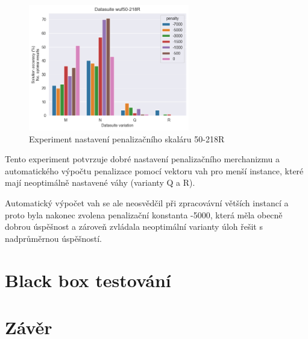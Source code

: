 \documentclass[twoside,twocolumn]{article}
\begin{document}
    \begin{figure}
        \centering
        \includegraphics[width=7cm]{images/testing/penalty/wuf50-218R}
        \caption{Experiment nastavení penalizačního skaláru 50-218R}
        \label{fig:penalty_218}
    \end{figure}

    Tento experiment potvrzuje dobré nastavení penalizačního merchanizmu a automatického výpočtu penalizace pomocí vektoru vah
    pro menší instance, které mají neoptimálně nastavené váhy (varianty Q a R).

    Automatický výpočet vah se ale neosvědčil při zpracovávní větších instancí a proto byla nakonec zvolena penalizační
    konstanta -5000, která měla obecně dobrou úspěšnost a zároveň zvládala neoptimální varianty úloh řešit s nadprůměrnou úspěšností.



    \section{Black box testování}



    \section{Závěr}


    \clearpage

    
    

%
%

\end{document}
